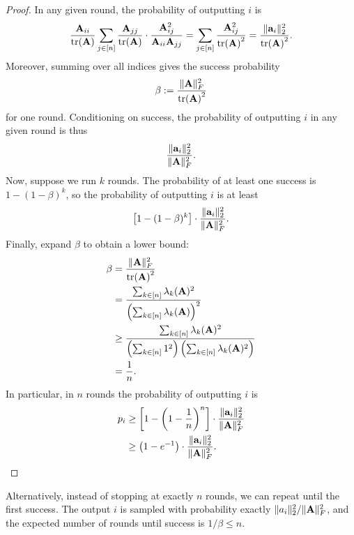 \documentclass{article}
\begin{document}
\begin{proof}
    In any given round, the probability of outputting $i$ is
    \[\frac{\mathbf{A}_{ii}}{\tr(\mathbf{A})}\sum_{j\in [n]} \frac{\mathbf{A}_{jj}}{\tr(\mathbf{A})}\cdot \frac{\mathbf{A}_{ij}^2}{\mathbf{A}_{ii}\mathbf{A}_{jj}} = \sum_{j\in [n]}\frac{\mathbf{A}_{ij}^2}{\tr(\mathbf{A})^2} = \frac{\|\mathbf{a}_i\|^2_2}{\tr(\mathbf{A})^2}.\]
    Moreover, summing over all indices gives the success probability
    \[\beta := \frac{\|\mathbf{A}\|^2_F}{\tr(\mathbf{A})^2}\]
    for one round. Conditioning on success, the probability of outputting $i$ in any given round is thus
    \[\frac{\|\mathbf{a}_i\|^2_2}{\|\mathbf{A}\|^2_F}.\]
    Now, suppose we run $k$ rounds. The probability of at least one success is 
    $1 - (1-\beta)^k$,
    so the probability of outputting $i$ is at least
    \[\left[1 - (1-\beta)^k\right]\cdot \frac{\|\mathbf{a}_i\|^2_2}{\|\mathbf{A}\|^2_F}.\]
    Finally, expand $\beta$ to obtain a lower bound:
    \begin{align*}
        \beta &= \frac{\|\mathbf{A}\|^2_F}{\tr(\mathbf{A})^2}\\
        &= \frac{\sum_{k \in [n]}\lambda_k(\mathbf{A})^2}{\left(\sum_{k \in [n]}\lambda_k(\mathbf{A})\right)^2}\\
        &\geq \frac{\sum_{k \in [n]}\lambda_k(\mathbf{A})^2}{\left(\sum_{k \in [n]}1^2\right)\left(\sum_{k \in [n]}\lambda_k(\mathbf{A})^2\right)}\\
        &= \frac{1}{n}.
    \end{align*}
    In particular, in $n$ rounds the probability of outputting $i$ is
    \begin{align*}
        p_i&\geq \left[1 - \left(1-\frac{1}{n}\right)^n\right]\cdot \frac{\|\mathbf{a}_i\|^2_2}{\|\mathbf{A}\|^2_F}\\
        &\geq \left(1 - e^{-1}\right)\cdot \frac{\|\mathbf{a}_i\|^2_2}{\|\mathbf{A}\|^2_F}.
    \end{align*}
\end{proof}

Alternatively, instead of stopping at exactly $n$ rounds, we can repeat until the first success. The output $i$ is sampled with probability exactly $\|a_i\|^2_2 / \|\mathbf{A}\|^2_F$, and the expected number of rounds until success is $1/\beta \leq n$.

\end{document}

